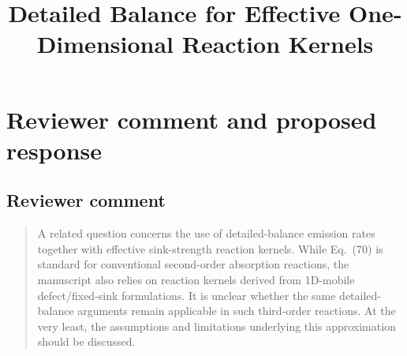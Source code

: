 \documentclass[11pt]{article}
\title{Detailed Balance for Effective One-Dimensional Reaction Kernels}
\author{}
\date{}
\begin{document}
\maketitle

\section{Reviewer comment and proposed response}
\subsection*{Reviewer comment}
\begin{quote}
A related question concerns the use of detailed-balance emission rates
together with effective sink-strength reaction kernels. While Eq.~(70) is
standard for conventional second-order absorption reactions, the manuscript
also relies on reaction kernels derived from 1D-mobile defect/fixed-sink
formulations. It is unclear whether the same detailed-balance arguments remain
applicable in such third-order reactions. At the very least, the assumptions
and limitations underlying this approximation should be discussed.
\end{quote}
\end{document}
